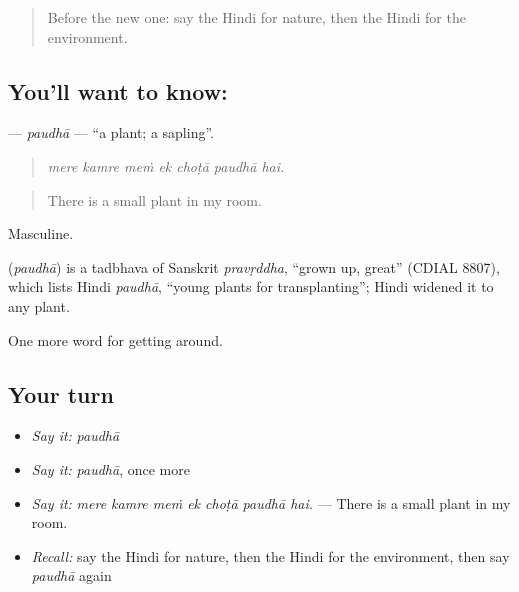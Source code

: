 \label{lesson:HI-C446-paudha}



\begin{quote}
Before the new one: say the Hindi for nature, then the Hindi for the environment.
\end{quote}

\subsection*{You'll want to know: }
\textbf{} — \emph{paudhā} — \textquotedblleft{}a plant; a sapling\textquotedblright{}.

\begin{quote}
      
\end{quote}

\begin{quote}
\emph{mere kamre meṁ ek choṭā paudhā hai.}
\end{quote}

\begin{quote}
There is a small plant in my room.
\end{quote}

Masculine.

\begin{cousinweb}
\textbf{} (\emph{paudhā}) is a tadbhava of Sanskrit \emph{pravṛddha}, \textquotedblleft{}grown up, great\textquotedblright{} (CDIAL 8807), which lists Hindi \emph{paudhā}, \textquotedblleft{}young plants for transplanting\textquotedblright{}; Hindi widened it to any plant.
\end{cousinweb}

\begin{grammarlens}[title={What you've built}]
One more word for getting around.
\end{grammarlens}

\subsection*{Your turn}
\begin{itemize}
\raggedright
  \item \emph{Say it:} \emph{paudhā}
  \item \emph{Say it:} \emph{paudhā}, once more
  \item \emph{Say it:} \emph{mere kamre meṁ ek choṭā paudhā hai.} — There is a small plant in my room.
  \item \emph{Recall:} say the Hindi for nature, then the Hindi for the environment, then say \emph{paudhā} again
\end{itemize}

